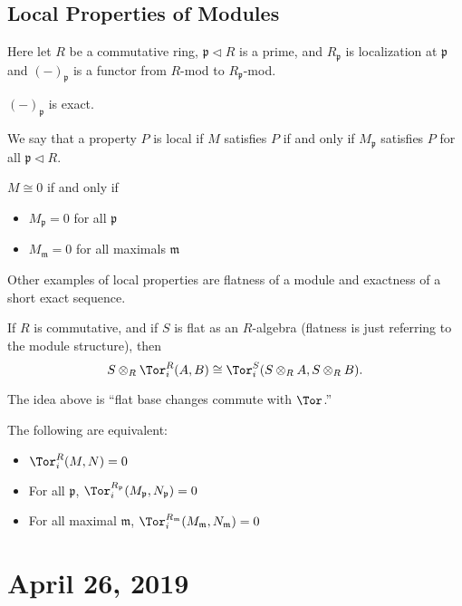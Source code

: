 \documentclass[12pt]{article}
\begin{document}
\subsection{Local Properties of Modules}
Here let $R$ be a commutative ring, $\mathfrak p\lhd R$ is a prime, and $R_{\mathfrak p}$ is localization at $\mathfrak p$
and $(-)_{\mathfrak p}$ is a functor from $R$-mod to $R_{\mathfrak p}$-mod.
\begin{prop}
	$(-)_{\mathfrak p}$ is exact.
\end{prop}
\begin{defn}[Informal]
	We say that a property $P$ is local if $M$ satisfies $P$ if and only if $M_{\mathfrak p}$ satisfies $P$ for all $\mathfrak p\lhd R$.
\end{defn}
\begin{prop}
	$M\cong 0$ if and only if
	\begin{itemize}
		\item $M_{\mathfrak p}=0$ for all $\mathfrak p$
		\item $M_{\mathfrak m}=0$ for all maximals $\mathfrak m$
	\end{itemize}
\end{prop}
\begin{rmk}
	Other examples of local properties are flatness of a module and exactness of a short exact sequence.
\end{rmk}
\begin{prop}
	If $R$ is commutative, and if $S$ is flat as an $R$-algebra (flatness is just referring to the module structure), then
	\[S\otimes_R\Tor^R_i(A,B)\cong \Tor_i^S(S\otimes_R A,S\otimes_R B).\]
\end{prop}
\begin{rmk}
	The idea above is ``flat base changes commute with $\Tor$.''
\end{rmk}
\begin{cor}
	The following are equivalent:
	\begin{itemize}
		\item $\Tor_i^R(M,N)=0$
		\item For all $\mathfrak p$, $\Tor_i^{R_{\mathfrak p}}(M_{\mathfrak p},N_{\mathfrak p})=0$
		\item For all maximal $\mathfrak m$, $\Tor_i^{R_{\mathfrak m}}(M_{\mathfrak m},N_{\mathfrak m})=0$
	\end{itemize}
\end{cor}

\section{April 26, 2019}
\end{document}
